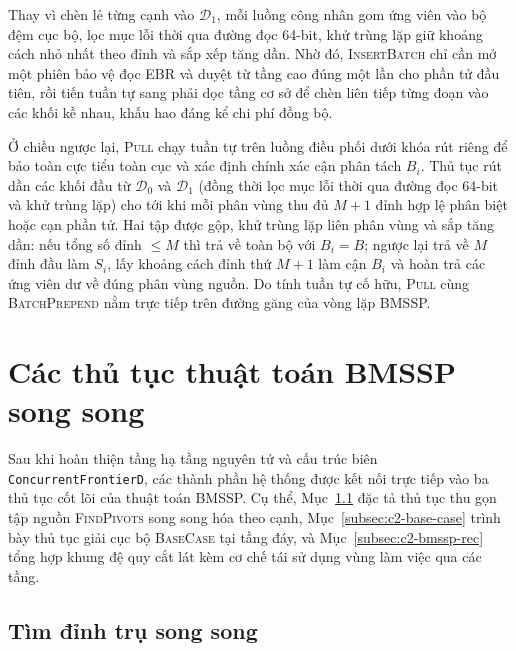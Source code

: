 Thay vì chèn lẻ từng cạnh vào $\mathcal{D}_1$, mỗi luồng công nhân gom ứng viên vào bộ đệm cục bộ, lọc mục lỗi thời qua đường đọc 64-bit, khử trùng lặp giữ khoảng cách nhỏ nhất theo đỉnh và sắp xếp tăng dần. Nhờ đó, \textsc{InsertBatch} chỉ cần mở một phiên bảo vệ đọc EBR và duyệt từ tầng cao đúng một lần cho phần tử đầu tiên, rồi tiến tuần tự sang phải dọc tầng cơ sở để chèn liên tiếp từng đoạn vào các khối kề nhau, khấu hao đáng kể chi phí đồng bộ.

Ở chiều ngược lại, \textsc{Pull} chạy tuần tự trên luồng điều phối dưới khóa rút riêng để bảo toàn cực tiểu toàn cục và xác định chính xác cận phân tách $B_i$. Thủ tục rút dần các khối đầu từ $\mathcal{D}_0$ và $\mathcal{D}_1$ (đồng thời lọc mục lỗi thời qua đường đọc 64-bit và khử trùng lặp) cho tới khi mỗi phân vùng thu đủ $M + 1$ đỉnh hợp lệ phân biệt hoặc cạn phần tử. Hai tập được gộp, khử trùng lặp liên phân vùng và sắp tăng dần: nếu tổng số đỉnh $\le M$ thì trả về toàn bộ với $B_i = B$; ngược lại trả về $M$ đỉnh đầu làm $S_i$, lấy khoảng cách đỉnh thứ $M + 1$ làm cận $B_i$ và hoàn trả các ứng viên dư về đúng phân vùng nguồn. Do tính tuần tự cố hữu, \textsc{Pull} cùng \textsc{BatchPrepend} nằm trực tiếp trên đường găng của vòng lặp BMSSP.

\section{Các thủ tục thuật toán BMSSP song song}\label{sec:c2-thuat-toan}

Sau khi hoàn thiện tầng hạ tầng nguyên tử và cấu trúc biên \texttt{Concurrent\allowbreak FrontierD}, các thành phần hệ thống được kết nối trực tiếp vào ba thủ tục cốt lõi của thuật toán BMSSP. Cụ thể, Mục~\ref{subsec:c2-find-pivots} đặc tả thủ tục thu gọn tập nguồn \textsc{FindPivots} song song hóa theo cạnh, Mục~\ref{subsec:c2-base-case} trình bày thủ tục giải cục bộ \textsc{BaseCase} tại tầng đáy, và Mục~\ref{subsec:c2-bmssp-rec} tổng hợp khung đệ quy cắt lát kèm cơ chế tái sử dụng vùng làm việc qua các tầng.

\subsection{Tìm đỉnh trụ song song}\label{subsec:c2-find-pivots}

